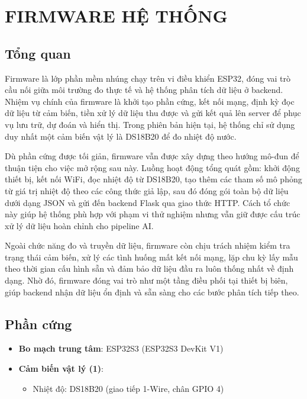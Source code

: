 \section{FIRMWARE HỆ THỐNG}

\subsection{Tổng quan}
Firmware là lớp phần mềm nhúng chạy trên vi điều khiển ESP32, đóng vai trò cầu nối giữa môi trường đo thực tế và hệ thống phân tích dữ liệu ở backend. Nhiệm vụ chính của firmware là khởi tạo phần cứng, kết nối mạng, định kỳ đọc dữ liệu từ cảm biến, tiền xử lý dữ liệu thu được và gửi kết quả lên server để phục vụ lưu trữ, dự đoán và hiển thị. Trong phiên bản hiện tại, hệ thống chỉ sử dụng duy nhất một cảm biến vật lý là DS18B20 để đo nhiệt độ nước.

Dù phần cứng được tối giản, firmware vẫn được xây dựng theo hướng mô-đun để thuận tiện cho việc mở rộng sau này. Luồng hoạt động tổng quát gồm: khởi động thiết bị, kết nối WiFi, đọc nhiệt độ từ DS18B20, tạo thêm các tham số mô phỏng từ giá trị nhiệt độ theo các công thức giả lập, sau đó đóng gói toàn bộ dữ liệu dưới dạng JSON và gửi đến backend Flask qua giao thức HTTP. Cách tổ chức này giúp hệ thống phù hợp với phạm vi thử nghiệm nhưng vẫn giữ được cấu trúc xử lý dữ liệu hoàn chỉnh cho pipeline AI.

Ngoài chức năng đo và truyền dữ liệu, firmware còn chịu trách nhiệm kiểm tra trạng thái cảm biến, xử lý các tình huống mất kết nối mạng, lặp chu kỳ lấy mẫu theo thời gian cấu hình sẵn và đảm bảo dữ liệu đầu ra luôn thống nhất về định dạng. Nhờ đó, firmware đóng vai trò như một tầng điều phối tại thiết bị biên, giúp backend nhận dữ liệu ổn định và sẵn sàng cho các bước phân tích tiếp theo.

\subsection{Phần cứng}
\begin{itemize}
    \item \textbf{Bo mạch trung tâm}: ESP32S3 (ESP32S3 DevKit V1)
    \item \textbf{Cảm biến vật lý (1)}:
    \begin{itemize}
        \item Nhiệt độ: DS18B20 (giao tiếp 1-Wire, chân GPIO 4)
    \end{itemize}
\end{itemize}

